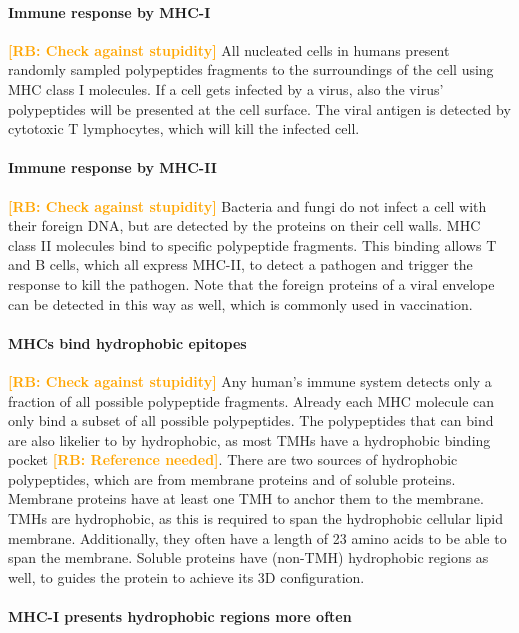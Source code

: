\documentclass{article}
\newcommand{\richel}[1]{\textcolor{orange}{\textbf{[RB: #1]}}}
\begin{document}
\paragraph{Immune response by MHC-I}

\richel{Check against stupidity}
All nucleated cells in humans present randomly sampled polypeptides
fragments to the surroundings of the cell using MHC class I molecules.
If a cell gets infected by a virus, also the virus' polypeptides
will be presented at the cell surface. The viral antigen is detected 
by cytotoxic T lymphocytes, which will kill the infected cell.

\paragraph{Immune response by MHC-II}

\richel{Check against stupidity}
Bacteria and fungi do not infect a cell with their foreign DNA,
but are detected by the proteins on their cell walls. MHC class II molecules 
bind to specific polypeptide fragments. This binding allows T and B cells,
which all express MHC-II, to detect a pathogen and trigger the response to
kill the pathogen. Note that the foreign proteins of a viral envelope 
can be detected in this way as well, which is commonly used in vaccination.

\paragraph{MHCs bind hydrophobic epitopes}

\richel{Check against stupidity}
Any human's immune system detects only a fraction of all possible
polypeptide fragments. 
Already each MHC molecule can only bind a
subset of all possible polypeptides. 
The polypeptides that can bind are also likelier to by hydrophobic,
as most TMHs have a hydrophobic binding pocket \richel{Reference needed}.
There are two sources of hydrophobic polypeptides, which are 
from membrane proteins and of soluble proteins.
Membrane proteins have at least one TMH to anchor them to
the membrane. TMHs are hydrophobic, as this is required to span the 
hydrophobic cellular lipid membrane. Additionally,
they often have a length of 23 amino acids to be able to span
the membrane.
Soluble proteins have (non-TMH) hydrophobic regions as well, 
to guides the protein to achieve its 3D configuration.

\paragraph{MHC-I presents hydrophobic regions more often}
\end{document}
